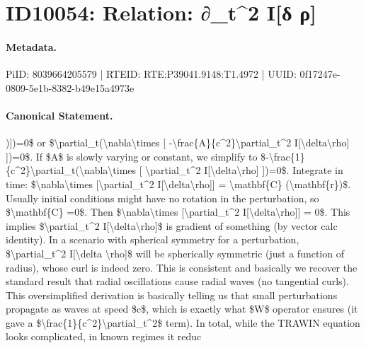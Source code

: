 \section*{ID10054: Relation: ∂\_t\textasciicircum{}2 I[δ ρ]}
\paragraph{Metadata.}
PiID: 8039664205579 | RTEID: RTE:P39041.9148:T1.4972 | UUID: 0f17247e-0809-5e1b-8382-b49e15a4973e

\paragraph{Canonical Statement.}
)])=0\$ or \$\textbackslash{}partial\_t(\textbackslash{}nabla\textbackslash{}times [ -\textbackslash{}frac\{A\}\{c\textasciicircum{}2\}\textbackslash{}partial\_t\textasciicircum{}2 I[\textbackslash{}delta\textbackslash{}rho] ])=0\$. If \$A\$ is slowly varying or constant, we simplify to \$-\textbackslash{}frac\{1\}\{c\textasciicircum{}2\}\textbackslash{}partial\_t(\textbackslash{}nabla\textbackslash{}times [ \textbackslash{}partial\_t\textasciicircum{}2 I[\textbackslash{}delta\textbackslash{}rho] ])=0\$. Integrate in time: \$\textbackslash{}nabla\textbackslash{}times [\textbackslash{}partial\_t\textasciicircum{}2 I[\textbackslash{}delta\textbackslash{}rho]] = \textbackslash{}mathbf\{C\} (\textbackslash{}mathbf\{r\})\$. Usually initial conditions might have no rotation in the perturbation, so \$\textbackslash{}mathbf\{C\} =0\$. Then \$\textbackslash{}nabla\textbackslash{}times [\textbackslash{}partial\_t\textasciicircum{}2 I[\textbackslash{}delta\textbackslash{}rho]] = 0\$. This implies \$\textbackslash{}partial\_t\textasciicircum{}2 I[\textbackslash{}delta\textbackslash{}rho]\$ is gradient of something (by vector calc identity). In a scenario with spherical symmetry for a perturbation, \$\textbackslash{}partial\_t\textasciicircum{}2 I[\textbackslash{}delta \textbackslash{}rho]\$ will be spherically symmetric (just a function of radius), whose curl is indeed zero. This is consistent and basically we recover the standard result that radial oscillations cause radial waves (no tangential curls). This oversimplified derivation is basically telling us that small perturbations propagate as waves at speed \$c\$, which is exactly what \$W\$ operator ensures (it gave a \$\textbackslash{}frac\{1\}\{c\textasciicircum{}2\}\textbackslash{}partial\_t\textasciicircum{}2\$ term). In total, while the TRAWIN equation looks complicated, in known regimes it reduc

